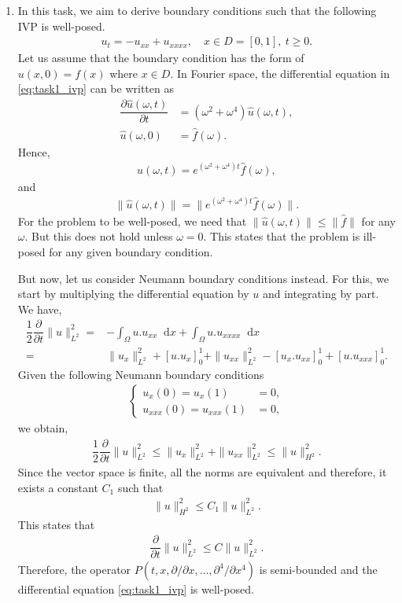 \documentclass[10pt,a4paper,twoside, french]{article}
\numberwithin{equation}{section}
\numberwithin{figure}{section}
\numberwithin{table}{section}
\newcommand{\diff}{\mathop{ }\mathopen{ }\mathrm{d}}
\begin{document}
\setcounter{section}{1}
\begin{enumerate}
\item In this task, we aim to derive boundary conditions such that the following IVP is well-posed.
\begin{align}
u_t=-u_{xx}+u_{xxxx},\quad x\in D=[0,1],~t\geq0.
\label{eq:task1_ivp}
\end{align}
Let us assume that the boundary condition has the form of $u(x,0)=f(x)$ where $x\in D$. In Fourier space, the differential equation in \eqref{eq:task1_ivp} can be written as
\begin{align}
\dfrac{\partial \hat{u}(\omega,t)}{\partial t} &= (\omega^2+\omega^4) \hat{u}(\omega,t),\\
\hat{u}(\omega,0) &= \hat{f}(\omega).
\end{align}
Hence,
\begin{align}
\hat{u}(\omega,t) = e^{(\omega^2+\omega^4)t}\hat{f}(\omega),
\end{align}
and
\begin{align}
\|\hat{u}(\omega,t)\| = \|e^{(\omega^2+\omega^4)t}\hat{f}(\omega)\|.
\end{align}
For the problem to be well-posed, we need that $\|\hat{u}(\omega,t)\|\leq \|\hat{f}\|$ for any $\omega$. But this does not hold unless $\omega=0$. This states that the problem is ill-posed for any given boundary condition.

But now, let us consider Neumann boundary conditions instead. For this, we start by multiplying the differential equation by $u$ and integrating by part. We have,
\begin{align}
\dfrac{1}{2}\dfrac{\partial}{\partial t}\|u\|^2_{L^2} =& -\int_{\Omega} u . u_{xx} \diff x + \int_{\Omega} u . u_{xxxx} \diff x \nonumber \\
=&\|u_x\|^2_{L^2} + [u . u_{x} ]_0^1 + \|u_{xx}\|^2_{L^2} - [u_x . u_{xx}]_0^1+[u . u_{xxx}]_0^1.
\end{align}
Given the following Neumann boundary conditions 
\begin{align}
\left\lbrace
\begin{array}{cc}
u_x(0) = u_x(1) &= 0, \\
u_{xxx}(0) = u_{xxx}(1) &= 0, 
\end{array}\right.
\end{align}
we obtain,
\begin{align}
\dfrac{1}{2}\dfrac{\partial}{\partial t}\|u\|^2_{L^2} \leq \|u_{x}\|^2_{L^2} + \|u_{xx}\|^2_{L^2} \leq \|u\|^2_{H^2}.
\end{align}
Since the vector space is finite, all the norms are equivalent and therefore, it exists a constant $C_1$ such that 
\begin{align*}
\|u\|^2_{H^2}\leq C_1\|u\|^2_{L^2}.
\end{align*}
This states that
\begin{align}
\dfrac{\partial}{\partial t}\|u\|^2_{L^2} \leq C \|u\|^2_{L^2}.
\end{align}
Therefore, the operator $P(t,x,\partial/\partial x,\ldots,\partial^4/\partial x^4)$ is semi-bounded and the differential equation \eqref{eq:task1_ivp} is well-posed. 


\end{enumerate}
\end{document}
